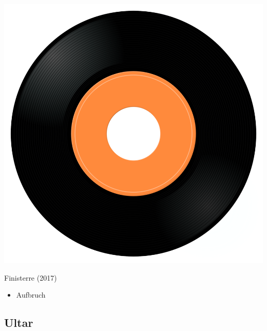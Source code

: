 \begin{minipage}[t]{0.25\textwidth}
\captionsetup{type=figure}
\includegraphics[width=\textwidth]{Images/cover.png}
\caption*{Finisterre (2017)}
\end{minipage}
\begin{minipage}[t]{0.25\textwidth}\vspace{0pt}
\begin{itemize}[nosep,leftmargin=1em,labelwidth=*,align=left]
	\setlength{\itemsep}{0pt}
	\item Aufbruch
\end{itemize}
\end{minipage}

\subsection{Ultar}


